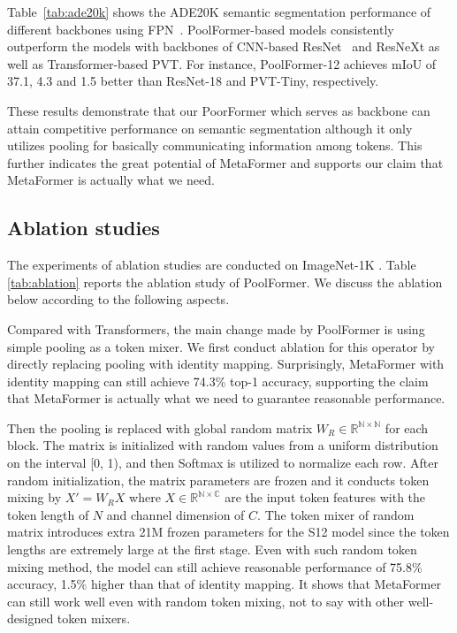  Table~\ref{tab:ade20k} shows the ADE20K semantic segmentation performance of different backbones using FPN~\cite{fpn}. PoolFormer-based models consistently outperform the models with backbones of CNN-based ResNet~\cite{resnet} and ResNeXt \cite{xie2017aggregated} as well as Transformer-based PVT. For instance, PoolFormer-12 achieves mIoU of 37.1, 4.3 and 1.5 better than ResNet-18 and PVT-Tiny, respectively. 


These results demonstrate that our PoorFormer which serves as backbone can attain competitive performance on semantic segmentation although it only utilizes pooling for basically communicating information among tokens. This further indicates the great potential of MetaFormer and supports our claim that MetaFormer is actually what we need.


\subsection{Ablation studies}
\label{sec:ablation}
The experiments of ablation studies are conducted on ImageNet-1K \cite{imagenet}.
Table \ref{tab:ablation} reports the ablation study of PoolFormer. 
We discuss the ablation below according to the following aspects. 


 Compared with Transformers, the main change made by PoolFormer is using simple pooling as a token mixer. We first conduct ablation for this operator by directly replacing pooling with identity mapping. Surprisingly, MetaFormer with identity mapping can still achieve 74.3\% top-1 accuracy, supporting the claim that MetaFormer is actually what we need to guarantee reasonable performance.


Then the pooling is replaced with global random matrix $W_R\in \mathbb{R^{N\times N}}$ for each block. The matrix is initialized with random values from a uniform distribution on the interval [0, 1), and then Softmax is utilized to normalize each row. After random initialization, the matrix parameters are frozen and it conducts token mixing by $X'=W_RX$ where $X\in \mathbb{R^{N\times C}}$ are the input token features with the token length of $N$ and channel dimension of $C$. The token mixer of random matrix introduces extra 21M frozen parameters for the S12 model since the token lengths are extremely large at the first stage. Even with such random token mixing method, the model can still achieve reasonable performance of 75.8\% accuracy, 1.5\% higher than that of identity mapping. It shows that MetaFormer can still work well even with random token mixing, not to say with other well-designed token mixers. 


